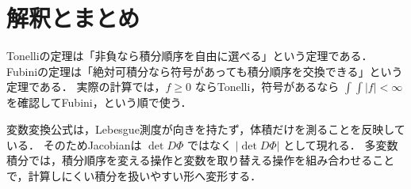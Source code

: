 \section{解釈とまとめ}

Tonelliの定理は「非負なら積分順序を自由に選べる」という定理である．
Fubiniの定理は「絶対可積分なら符号があっても積分順序を交換できる」という定理である．
実際の計算では，$f\ge0$ ならTonelli，符号があるなら $\int\int |f|<\infty$ を確認してFubini，という順で使う．

変数変換公式は，Lebesgue測度が向きを持たず，体積だけを測ることを反映している．
そのためJacobianは $\det D\Phi$ ではなく $|\det D\Phi|$ として現れる．
多変数積分では，積分順序を変える操作と変数を取り替える操作を組み合わせることで，計算しにくい積分を扱いやすい形へ変形する．
